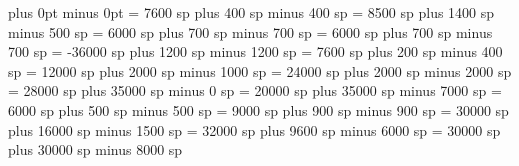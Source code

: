 %
%
%


\grezerowidthspace=0pt plus 0pt minus 0pt
\greinterglyphspace = 7600 sp plus 400 sp minus 400 sp
\grealterationspace = 8500 sp plus 1400 sp minus 500 sp
\greclefflatspace = 6000 sp plus 700 sp minus 700 sp
\grebeforechoralsignspace = 6000 sp plus 700 sp minus 700 sp
\grebeforealterationspace = -36000 sp plus 1200 sp minus 1200 sp
\greinterelementspace = 7600 sp plus 200 sp minus 400 sp
\grelargerspace = 12000 sp plus 2000 sp minus 1000 sp
\greglyphspace = 24000 sp plus 2000 sp minus 2000 sp
\greintersyllablespace= 28000 sp plus 35000 sp minus 0 sp
\grespacebeforecusto = 20000 sp plus 35000 sp minus 7000 sp
\grespacebeforesigns= 6000 sp plus 500 sp minus 500 sp
\grespaceaftersigns= 9000 sp plus 900 sp minus 900 sp
\grespaceafterlineclef = 30000 sp plus 16000 sp minus 1500 sp
\greinterwordspacenotes = 32000 sp plus 9600 sp minus 6000 sp
\greinterwordspacenotestext = 30000 sp plus 30000 sp minus 8000 sp
